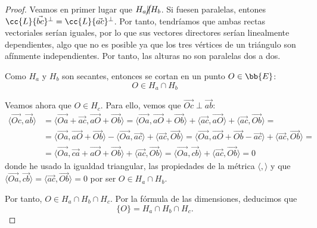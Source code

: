 \begin{proof}
    Veamos en primer lugar que $H_a \cancel{\|} H_b$. Si fuesen paralelas, entones ${\cc{L}\{\vec{bc}\}^\perp} = {\cc{L}\{\vec{ac}\}^\perp}$. Por tanto, tendríamos que ambas rectas vectoriales serían iguales, por lo que sus vectores directores serían linealmente dependientes, algo que no es posible ya que los tres vértices de un triángulo son afínmente independientes. Por tanto, las alturas no son paralelas dos a dos.

    Como $H_a$ y $H_b$ son secantes, entonces se cortan en un punto $O\in \bb{E}$:
    \begin{equation*}
        O\in H_a\cap H_b
    \end{equation*}

    Veamos ahora que $O\in H_c$. Para ello, vemos que $\vec{Oc}\perp \vec{ab}$:
    \begin{equation*}
        \begin{split}
            \langle \vec{Oc},\vec{ab}\rangle &=
             \langle \vec{Oa} + \vec{ac},\vec{aO}+\vec{Ob}\rangle
             =
             \langle \vec{Oa},\vec{aO}+\vec{Ob}\rangle + \langle\vec{ac},\vec{aO}\rangle + \langle\vec{ac},\vec{Ob}\rangle =\\&
             =
             \langle \vec{Oa},\vec{aO}+\vec{Ob}\rangle -\langle\vec{Oa},\vec{ac}\rangle + \langle\vec{ac},\vec{Ob}\rangle
              =
             \langle \vec{Oa},\vec{aO}+\vec{Ob}-\vec{ac}\rangle + \langle\vec{ac},\vec{Ob}\rangle =\\&
             =
             \langle \vec{Oa},\vec{ca} + \vec{aO}+\vec{Ob}\rangle + \langle\vec{ac},\vec{Ob}\rangle
             =
             \langle \vec{Oa},\vec{cb}\rangle + \langle\vec{ac},\vec{Ob}\rangle = 0
        \end{split}
    \end{equation*}
    donde he usado la igualdad triangular, las propiedades de la métrica $\langle,\rangle$ y que $\langle \vec{Oa},\vec{cb}\rangle = \langle\vec{ac},\vec{Ob}\rangle = 0$ por ser $O\in H_a\cap H_b$.

    Por tanto, $O\in H_a\cap H_b\cap H_c$. Por la fórmula de las dimensiones, deducimos que $$\{O\}=H_a\cap H_b\cap H_c.$$
\end{proof}


